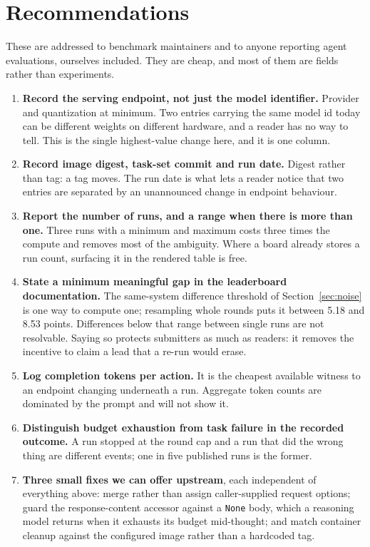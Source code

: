 \section{Recommendations}
\label{sec:recs}

These are addressed to benchmark maintainers and to anyone reporting agent
evaluations, ourselves included. They are cheap, and most of them are fields
rather than experiments.

\begin{enumerate}\itemsep2pt
\item \textbf{Record the serving endpoint, not just the model identifier.}
  Provider and quantization at minimum. Two entries carrying the same model id
  today can be different weights on different hardware, and a reader has no way
  to tell. This is the single highest-value change here, and it is one column.
\item \textbf{Record image digest, task-set commit and run date.} Digest rather
  than tag: a tag moves. The run date is what lets a reader notice that two
  entries are separated by an unannounced change in endpoint behaviour.
\item \textbf{Report the number of runs, and a range when there is more than
  one.} Three runs with a minimum and maximum costs three times the compute and
  removes most of the ambiguity. Where a board already stores a run count,
  surfacing it in the rendered table is free.
\item \textbf{State a minimum meaningful gap in the leaderboard
  documentation.} The same-system difference threshold of
  Section~\ref{sec:noise} is one way to compute one; resampling whole rounds
  puts it between 5.18 and 8.53 points. Differences below that range between
  single runs are not resolvable. Saying so protects submitters as much as
  readers: it removes the incentive to claim a lead that a re-run would
  erase.
\item \textbf{Log completion tokens per action.} It is the cheapest available
  witness to an endpoint changing underneath a run. Aggregate token counts are
  dominated by the prompt and will not show it.
\item \textbf{Distinguish budget exhaustion from task failure in the recorded
  outcome.} A run stopped at the round cap and a run that did the wrong thing
  are different events; one in five published runs is the former.
\item \textbf{Three small fixes we can offer upstream}, each independent of
  everything above: merge rather than assign caller-supplied request options;
  guard the response-content accessor against a \texttt{None} body, which a
  reasoning model returns when it exhausts its budget mid-thought; and match
  container cleanup against the configured image rather than a hardcoded tag.
\end{enumerate}

